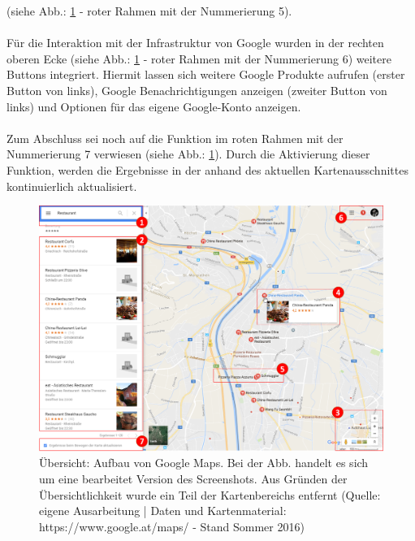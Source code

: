 \documentclass[../Bachelorarbeit.tex]{subfiles}
\begin{document}
(siehe Abb.: \ref{fig:googlemapOverview} - roter Rahmen mit der Nummerierung 5).\\
\\
Für die Interaktion mit der Infrastruktur von Google wurden in der rechten oberen Ecke (siehe Abb.: \ref{fig:googlemapOverview} - roter Rahmen mit der Nummerierung 6) weitere Buttons integriert.
Hiermit lassen sich weitere Google Produkte aufrufen (erster Button von links), Google Benachrichtigungen anzeigen (zweiter Button von links) und Optionen für das eigene Google-Konto anzeigen.\\
\\
Zum Abschluss sei noch auf die Funktion im roten Rahmen mit der Nummerierung 7 verwiesen (siehe Abb.: \ref{fig:googlemapOverview}). 
Durch die Aktivierung dieser Funktion, werden die Ergebnisse in der  anhand des aktuellen Kartenausschnittes kontinuierlich aktualisiert.

\begin{figure}[H]
\centering
\includegraphics[width=1\linewidth]{img/StandDerTechnik/googlemapOverview}
\caption[Übersicht: Aufbau von Google Maps]{Übersicht: Aufbau von Google Maps. Bei der Abb. handelt es sich um eine bearbeitet Version des Screenshots. Aus Gründen der Übersichtlichkeit wurde ein Teil der Kartenbereichs entfernt (Quelle: eigene Ausarbeitung | Daten und Kartenmaterial: https://www.google.at/maps/ - Stand Sommer 2016)}
\label{fig:googlemapOverview}
\end{figure}
\end{document}
